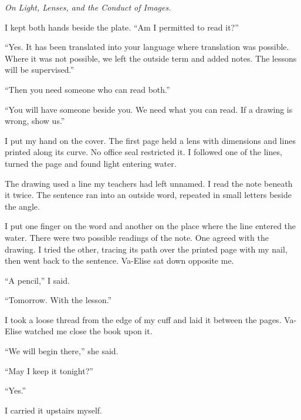 \textit{On Light, Lenses, and the Conduct of Images.}\par

I kept both hands beside the plate. ``Am I permitted to read it?''\par

``Yes. It has been translated into your language where translation was possible. Where it was not possible, we left the outside term and added notes. The lessons will be supervised.''\par

``Then you need someone who can read both.''\par

``You will have someone beside you. We need what you can read. If a drawing is wrong, show us.''\par

I put my hand on the cover. The first page held a lens with dimensions and lines printed along its curve. No office seal restricted it. I followed one of the lines, turned the page and found light entering water.\par

The drawing used a line my teachers had left unnamed. I read the note beneath it twice. The sentence ran into an outside word, repeated in small letters beside the angle.\par

I put one finger on the word and another on the place where the line entered the water. There were two possible readings of the note. One agreed with the drawing. I tried the other, tracing its path over the printed page with my nail, then went back to the sentence. Va-Elise sat down opposite me.\par

``A pencil,'' I said.\par

``Tomorrow. With the lesson.''\par

I took a loose thread from the edge of my cuff and laid it between the pages. Va-Elise watched me close the book upon it.\par

``We will begin there,'' she said.\par

``May I keep it tonight?''\par

``Yes.''\par

I carried it upstairs myself.\par

